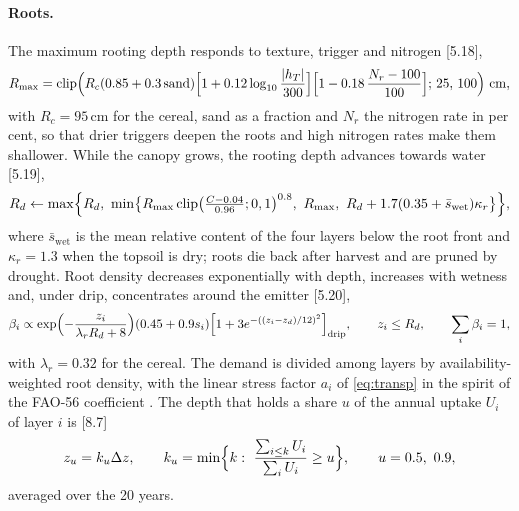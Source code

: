 \paragraph{Roots.} The maximum rooting depth responds to texture, trigger and nitrogen [5.18],
\begin{equation}
R_{\max}=\mathrm{clip}\Bigl(R_c(0.85+0.3\,\mathrm{sand})\Bigl[1+0.12\log_{10}\frac{|h_T|}{300}\Bigr]\Bigl[1-0.18\,\frac{N_r-100}{100}\Bigr];\,25,\,100\Bigr)\ \mathrm{cm},
\label{eq:rmax}
\end{equation}
with $R_c=95$\,cm for the cereal, sand as a fraction and $N_r$ the nitrogen rate in per cent, so that drier triggers deepen the roots and high nitrogen rates make them shallower. While the canopy grows, the rooting depth advances towards water [5.19],
\begin{equation}
R_d\leftarrow\max\Bigl\{R_d,\ \min\bigl\{R_{\max}\,\mathrm{clip}\bigl(\tfrac{C-0.04}{0.96};0,1\bigr)^{0.8},\ R_{\max},\ R_d+1.7(0.35+\bar s_{\mathrm{wet}})\kappa_r\bigr\}\Bigr\},
\label{eq:rd}
\end{equation}
where $\bar s_{\mathrm{wet}}$ is the mean relative content of the four layers below the root front and $\kappa_r=1.3$ when the topsoil is dry; roots die back after harvest and are pruned by drought. Root density decreases exponentially with depth, increases with wetness and, under drip, concentrates around the emitter [5.20],
\begin{equation}
\beta_i\propto\exp\Bigl(-\frac{z_i}{\lambda_rR_d+8}\Bigr)(0.45+0.9s_i)\Bigl[1+3e^{-((z_i-z_d)/12)^2}\Bigr]_{\text{drip}},\qquad z_i\le R_d,\qquad \sum_i\beta_i=1,
\label{eq:rootdens}
\end{equation}
with $\lambda_r=0.32$ for the cereal. The demand is divided among layers by availability-weighted root density, with the linear stress factor $a_i$ of \cref{eq:transp} in the spirit of the FAO-56 coefficient \citep{Allen1998,Feddes1978}. The depth that holds a share $u$ of the annual uptake $U_i$ of layer $i$ is [8.7]
\begin{equation}
z_u=k_u\Delta z,\qquad k_u=\min\Bigl\{k:\ \frac{\sum_{i\le k}U_i}{\sum_iU_i}\ge u\Bigr\},\qquad u=0.5,\ 0.9,
\label{eq:zp}
\end{equation}
averaged over the 20 years.
